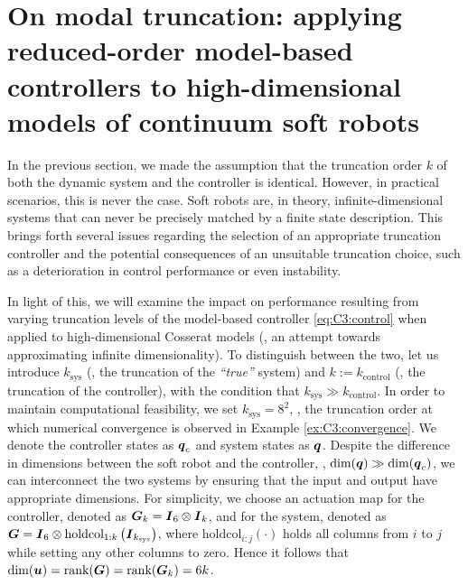 \newpage
\section{On modal truncation: applying reduced-order model-based controllers to high-dimensional models of continuum soft robots}
In the previous section, we made the assumption that the truncation order $k$ of both the dynamic system and the controller is identical. However, in practical scenarios, this is never the case. Soft robots are, in theory, infinite-dimensional systems that can never be precisely matched by a finite state description. This brings forth several issues regarding the selection of an appropriate truncation controller and the potential consequences of an unsuitable truncation choice, such as a deterioration in control performance or even instability.
%

In light of this, we will examine the impact on performance resulting from varying truncation levels of the model-based controller \eqref{eq:C3:control} when applied to high-dimensional Cosserat models (\ie, an attempt towards approximating infinite dimensionality). To distinguish between the two, let us introduce $k_{\textrm{sys}}$ (\ie, the truncation of the \textit{``true''} system) and $k:= k_{\textrm{control}}$ (\ie, the truncation of the controller), with the condition that $k_{\textrm{sys}} \gg k_{\textrm{control}}$. In order to maintain computational feasibility, we set $k_\textrm{sys} = 8^2$, \ie, the truncation order at which numerical convergence is observed in Example \ref{ex:C3:convergence}. We denote the controller states as ${\boldsymbol{q}}_c$ and system states as ${\boldsymbol{q}}$. Despite the difference in dimensions between the soft robot and the controller, \ie, $\text{dim}({\boldsymbol{q}}) \gg \text{dim}({\boldsymbol{q}}_c)$, we can interconnect the two systems by ensuring that the input and output have appropriate dimensions. For simplicity, we choose an actuation map for the controller, denoted as $\boldsymbol{G}_k = {\boldsymbol{I}}_6 \otimes {\boldsymbol{I}}_k$, and for the system, denoted as $\boldsymbol{G} = {\boldsymbol{I}}_6 \otimes \textrm{holdcol}_{1:k}\left( {\boldsymbol{I}}_{k_{\textrm{sys}}}\right)$, where $\textrm{holdcol}_{i:j}(\cdot)$ holds all columns from $i$ to $j$ while setting any other columns to zero. Hence it follows that $\text{dim}({\boldsymbol{u}}) = \textnormal{rank}({\boldsymbol{G}}) = \textnormal{rank}({\boldsymbol{G}}_k) = 6k$.

